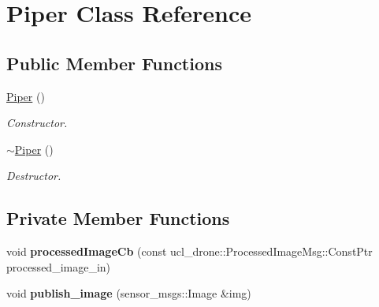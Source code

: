 \hypertarget{classPiper}{}\section{Piper Class Reference}
\label{classPiper}
\subsection*{Public Member Functions}
\begin{DoxyCompactItemize}
\item 
\mbox{\label{classPiper_a5fc123aeadd948e5473e4d0e29aa05ac}} 
\hyperlink{classPiper_a5fc123aeadd948e5473e4d0e29aa05ac}{Piper} ()
\begin{DoxyCompactList}\small\item\em Constructor. \end{DoxyCompactList}\item 
\mbox{\label{classPiper_ada0e445493d732701f137fa862b9bdab}} 
\hyperlink{classPiper_ada0e445493d732701f137fa862b9bdab}{$\sim$\+Piper} ()
\begin{DoxyCompactList}\small\item\em Destructor. \end{DoxyCompactList}\end{DoxyCompactItemize}
\subsection*{Private Member Functions}
\begin{DoxyCompactItemize}
\item 
\mbox{\label{classPiper_a4e67e91f1a95f4d1416b1ea7e1bd06ff}} 
void {\bfseries processed\+Image\+Cb} (const ucl\+\_\+drone\+::\+Processed\+Image\+Msg\+::\+Const\+Ptr processed\+\_\+image\+\_\+in)
\item 
\mbox{\label{classPiper_a7470705054d6590a61e55f07020aa0bd}} 
void {\bfseries publish\+\_\+image} (sensor\+\_\+msgs\+::\+Image \&img)
\end{DoxyCompactItemize}

